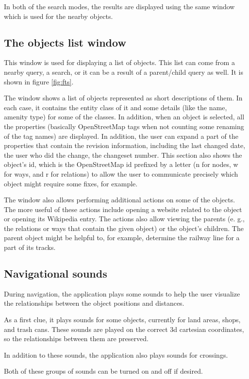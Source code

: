 \documentclass[nolof,digital]{fithesis3}
\begin{document}
In both of the search modes, the results are displayed using the same window which is used for the nearby objects.
\subsection{The objects list window}
This window is used for displaying a list of objects. This list can come from a nearby query, a search, or it can be a result of a parent/child query as well. It is shown in figure \ref{fig:fts}.

The window shows a list of objects represented as short descriptions of them. In each case, it contains the entity class of it and some details (like the name, amenity type) for some of the classes. In addition, when an object is selected, all the properties (basically OpenStreetMap tags when not counting some renaming of the tag names) are displayed. In addition, the user can expand a part of the properties that contain the revision information, including the last changed date, the user who did the change, the changeset number. This section also shows the object's id, which is the OpenStreetMap id prefixed by a letter (n for nodes, w for ways, and r for relations) to allow the user to communicate precisely which object might require some fixes, for example.

The window also allows performing additional actions on some of the objects. The more useful of these actions include opening a website related to the object or opening its Wikipedia entry. The actions also allow viewing the parents (e. g., the relations or ways that contain the given object) or the object's children. The parent object might be helpful to, for example, determine the railway line for a part of its tracks.
\subsection{Navigational sounds}
During navigation, the application plays some sounds to help the user visualize the relationships between the object positions and distances.

As a first clue, it plays sounds for some objects, currently for land areas, shops, and trash cans. These sounds are played on the correct 3d cartesian coordinates, so the relationships between them are preserved.

In addition to these sounds, the application also plays sounds for crossings.

Both of these groups of sounds can be turned on and off if desired.
\end{document}
